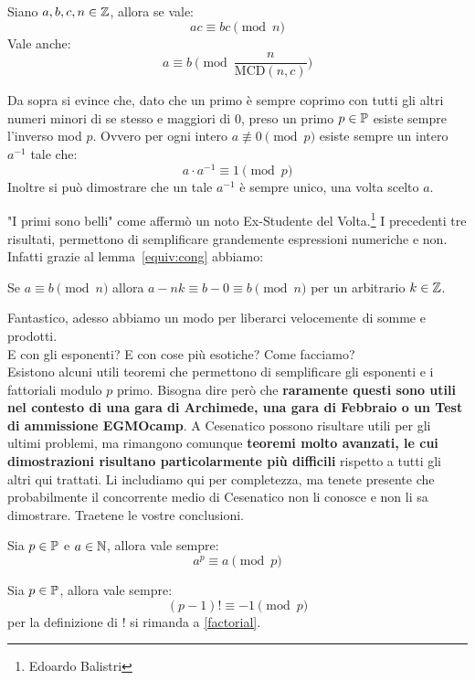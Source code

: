 \documentclass[11pt]{scrartcl}
\begin{document}
	\begin{lemma}
		Siano $a,b,c,n\in \mathbb Z$, allora se vale:
		$$ac\equiv bc \pmod{n}$$
		Vale anche:
		$$a \equiv b \pmod{\frac{n}{\text{MCD}(n,c)}}$$
	\end{lemma}
	\begin{corollary}
		Da sopra si evince che, dato che un primo è sempre coprimo con tutti gli altri numeri minori di se stesso e maggiori di $0$, preso un primo $p\in \mathbb P$ esiste sempre l'inverso mod $p$. Ovvero per ogni intero $a \not \equiv 0 \pmod{p}$ esiste sempre un intero $a^{-1}$ tale che:
		$$a\cdot a^{-1} \equiv 1 \pmod{p}$$
		Inoltre si può dimostrare che un tale $a^{-1}$ è sempre unico, una volta scelto $a$.
	\end{corollary}
	"I primi sono belli" come affermò un noto Ex-Studente del Volta.\footnote{Edoardo Balistri}
	I precedenti tre risultati, permettono di semplificare grandemente espressioni numeriche e non. Infatti grazie al lemma~\ref{equiv:cong} abbiamo:
	\begin{fact}
		
		Se $a \equiv b \pmod{n}$ allora $a-nk \equiv b-0 \equiv b \pmod{n}$ per un arbitrario $k \in \mathbb Z$.
	\end{fact}
	Fantastico, adesso abbiamo un modo per liberarci velocemente di somme e prodotti.\\
	E con gli esponenti? E con cose più esotiche? Come facciamo?\\
	Esistono alcuni utili teoremi che permettono di semplificare gli esponenti e i fattoriali modulo $p$ primo. Bisogna dire però che \textbf{raramente questi sono utili nel contesto di una gara di Archimede, una gara di Febbraio o un Test di ammissione EGMOcamp}. A Cesenatico possono risultare utili per gli ultimi problemi, ma rimangono comunque \textbf{teoremi molto avanzati, le cui dimostrazioni risultano particolarmente più difficili} rispetto a tutti gli altri qui trattati. Li includiamo qui per completezza, ma tenete presente che probabilmente il concorrente medio di Cesenatico non li conosce e non li sa dimostrare. Traetene le vostre conclusioni.
	\begin{theorem}
		Sia $p\in\mathbb P$ e $a\in\mathbb N$, allora vale sempre:
		$$a^p \equiv a \pmod{p}$$
	\end{theorem}
	\begin{theorem}[Wilson]
		Sia $p\in\mathbb P$, allora vale sempre:
		$$(p-1)! \equiv -1 \pmod{p}$$
		per la definizione di $!$ si rimanda a \ref{factorial}.
	\end{theorem}
\end{document}
